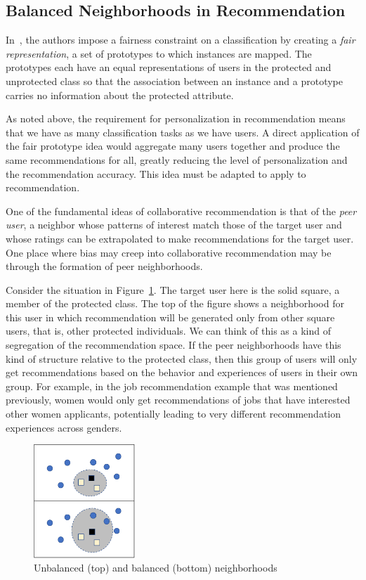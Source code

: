 \subsection{Balanced Neighborhoods in Recommendation}

In~\cite{zemel2013learning}, the authors impose a fairness constraint on a classification by creating a \textit{fair representation}, a set of prototypes to which instances are mapped. The prototypes each have an equal representations of users in the protected and unprotected class so that the association between an instance and a prototype carries no information about the protected attribute. 

As noted above, the requirement for personalization in recommendation means that we have as many classification tasks as we have users. A direct application of the fair prototype idea would aggregate many users together and produce the same recommendations for all, greatly reducing the level of personalization and the recommendation accuracy. This idea must be adapted to apply to recommendation.

One of the fundamental ideas of collaborative recommendation is that of the \textit{peer user}, a neighbor whose patterns of interest match those of the target user and whose ratings can be extrapolated to make recommendations for the target user. One place where bias may creep into collaborative recommendation may be through the formation of peer neighborhoods. 

Consider the situation in Figure~\ref{fig:neighbor}. The target user here is the solid square, a member of the protected class. The top of the figure shows a neighborhood for this user in which recommendation will be generated only from other square users, that is, other protected individuals. We can think of this as a kind of segregation of the recommendation space. If the peer neighborhoods have this kind of structure relative to the protected class, then this group of users will only get recommendations based on the behavior and experiences of users in their own group. For example, in the job recommendation example that was mentioned previously, women would only get recommendations of jobs that have interested other women applicants, potentially leading to very different recommendation experiences across genders. 

\begin{figure}[bh]
    \centering
    \includegraphics[width=1.5in]{imgs/bln/neighborhood.pdf}
    \caption{Unbalanced (top) and balanced (bottom) neighborhoods}
    \label{fig:neighbor}
\end{figure}

